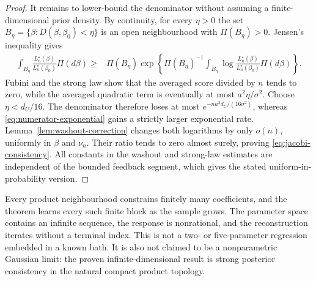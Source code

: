 \begin{proof}
It remains to lower-bound the denominator without assuming a finite-dimensional
prior density.  By continuity, for every \(\eta>0\) the set
\(B_\eta=\{\beta:D(\beta,\beta_0)<\eta\}\) is an open neighbourhood with
\(\Pi(B_\eta)>0\).  Jensen's inequality gives
\begin{align*}
 \int_{B_\eta}
 \frac{L_n^\star(\beta)}{L_n^\star(\beta_0)}\Pi(d\beta)
 \ge{}&\Pi(B_\eta)
 \exp\left\{
 \Pi(B_\eta)^{-1}\int_{B_\eta}
 \log\frac{L_n^\star(\beta)}{L_n^\star(\beta_0)}\Pi(d\beta)
 \right\}.
\end{align*}
Fubini and the strong law show that the averaged score divided by \(n\)
tends to zero, while the averaged quadratic term is eventually at most
\(a^2\eta/\sigma^2\).  Choose \(\eta<d_U/16\).  The denominator therefore
loses at most \(e^{-na^2d_U/(16\sigma^2)}\), whereas
\eqref{eq:numerator-exponential} gains a strictly larger exponential rate.
Lemma~\ref{lem:washout-correction} changes both logarithms by only \(o(n)\),
uniformly in \(\beta\) and \(\nu_n\).  Their ratio tends to zero almost
surely, proving \eqref{eq:jacobi-consistency}.  All constants in the washout
and strong-law estimates are independent of the bounded feedback segment,
which gives the stated uniform-in-probability version.
\end{proof}

\begin{remark}
Every product neighbourhood constrains finitely many coefficients, and the
theorem learns every such finite block as the sample grows.  The parameter
space contains an infinite sequence, the response is nonrational, and the
reconstruction iterates without a terminal index.  This is not a two- or
five-parameter regression embedded in a known bath.  It is also not claimed
to be a nonparametric Gaussian limit: the proven infinite-dimensional result
is strong posterior consistency in the natural compact product topology.
\end{remark}
